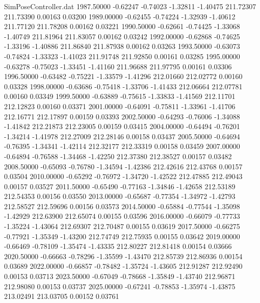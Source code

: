 \begin{filecontents}{SimPoseController.dat}
1987.50000   -0.62247   -0.74023    -1.32811   -1.40475  211.72307  211.73390    0.00163    0.03200
1989.00000   -0.62455   -0.74224    -1.32939   -1.40612  211.77120  211.78208    0.00162    0.03221
1990.50000   -0.62661   -0.74425    -1.33068   -1.40749  211.81964  211.83057    0.00162    0.03242
1992.00000   -0.62868   -0.74625    -1.33196   -1.40886  211.86840  211.87938    0.00162    0.03263
1993.50000   -0.63073   -0.74824    -1.33323   -1.41023  211.91748  211.92850    0.00161    0.03285
1995.00000   -0.63278   -0.75023    -1.33451   -1.41160  211.96688  211.97795    0.00161    0.03306
1996.50000   -0.63482   -0.75221    -1.33579   -1.41296  212.01660  212.02772    0.00160    0.03328
1998.00000   -0.63686   -0.75418    -1.33706   -1.41433  212.06664  212.07781    0.00160    0.03349
1999.50000   -0.63889   -0.75615    -1.33833   -1.41569  212.11701  212.12823    0.00160    0.03371
2001.00000   -0.64091   -0.75811    -1.33961   -1.41706  212.16771  212.17897    0.00159    0.03393
2002.50000   -0.64293   -0.76006    -1.34088   -1.41842  212.21873  212.23005    0.00159    0.03415
2004.00000   -0.64494   -0.76201    -1.34214   -1.41978  212.27009  212.28146    0.00158    0.03437
2005.50000   -0.64694   -0.76395    -1.34341   -1.42114  212.32177  212.33319    0.00158    0.03459
2007.00000   -0.64894   -0.76588    -1.34468   -1.42250  212.37380  212.38527    0.00157    0.03482
2008.50000   -0.65093   -0.76780    -1.34594   -1.42386  212.42616  212.43768    0.00157    0.03504
2010.00000   -0.65292   -0.76972    -1.34720   -1.42522  212.47885  212.49043    0.00157    0.03527
2011.50000   -0.65490   -0.77163    -1.34846   -1.42658  212.53189  212.54353    0.00156    0.03550
2013.00000   -0.65687   -0.77354    -1.34972   -1.42793  212.58527  212.59696    0.00156    0.03573
2014.50000   -0.65884   -0.77544    -1.35098   -1.42929  212.63900  212.65074    0.00155    0.03596
2016.00000   -0.66079   -0.77733    -1.35224   -1.43064  212.69307  212.70487    0.00155    0.03619
2017.50000   -0.66275   -0.77921    -1.35349   -1.43200  212.74749  212.75935    0.00155    0.03642
2019.00000   -0.66469   -0.78109    -1.35474   -1.43335  212.80227  212.81418    0.00154    0.03666
2020.50000   -0.66663   -0.78296    -1.35599   -1.43470  212.85739  212.86936    0.00154    0.03689
2022.00000   -0.66857   -0.78482    -1.35724   -1.43605  212.91287  212.92490    0.00153    0.03713
2023.50000   -0.67049   -0.78668    -1.35849   -1.43740  212.96871  212.98080    0.00153    0.03737
2025.00000   -0.67241   -0.78853    -1.35974   -1.43875  213.02491  213.03705    0.00152    0.03761

\end{filecontents}
